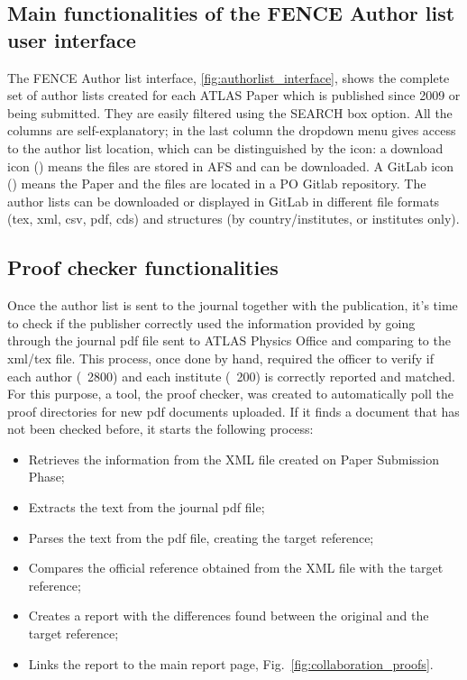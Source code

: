 \subsection{Main functionalities of the FENCE Author list user interface}
\label{sec:Main_functionalities_of_the_FENCE_Author_list_user_interface}

The FENCE Author list interface, \cref{fig:authorlist_interface}, shows the complete set of author lists created for each ATLAS Paper which is published since 2009 or being submitted.
They are easily filtered using the SEARCH box option.
All the columns are self-explanatory; in the last column the dropdown menu gives access to the author list location, which can be distinguished by the icon:
a download icon (\faDownload) means the files are stored in AFS and can be downloaded.
A GitLab icon (\faGitlab) means the Paper and the files are located in a PO Gitlab repository. The author lists can be downloaded or displayed in GitLab in different file formats (tex, xml, csv, pdf, cds) and structures (by country/institutes, or institutes only). 

\subsection{Proof checker functionalities}
\label{sec:Proof_checker_functionalities}
Once the author list is sent to the journal together with the publication, it’s time to check if the publisher correctly used the information provided by going through the journal pdf file sent to ATLAS Physics Office and comparing to the xml/tex file. This process, once done by hand, required the officer to verify if each author (~2800) and each institute (~200) is correctly reported and matched. 
For this purpose, a tool, the proof checker, was created to automatically poll the proof directories for new pdf documents uploaded. If it finds a document that has not been checked before, it starts the following process:

\begin{itemize}
\item Retrieves the information from the XML file created on Paper Submission Phase;
\item Extracts the text from the journal pdf file;
\item Parses the text from the pdf file, creating the target reference;
\item Compares the official reference obtained from the XML file with the target reference;
\item Creates a report with the differences found between the original and the target reference;
\item Links the report to the main report page, Fig.~\ref{fig:collaboration_proofs}.
\end{itemize}

